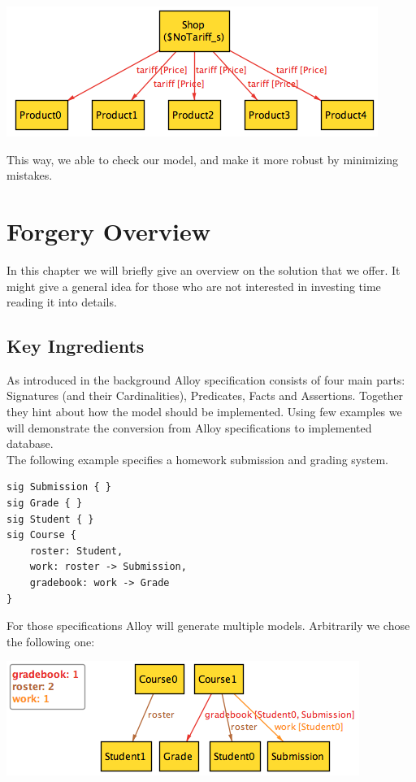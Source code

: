 \documentclass[oneside]{book}
\begin{document}
\begin{center}
\includegraphics[scale=0.6]{counterexample1}
\end{center}

This way, we able to check our model, and make it more robust by minimizing mistakes.

\newpage

\chapter{Forgery Overview}
In this chapter we will briefly give an overview on the solution that we offer. It might give a general idea for those who are not interested in investing time reading it into details.

\section{Key Ingredients}

As introduced in the background Alloy specification consists of four main parts: Signatures (and their Cardinalities), Predicates, Facts and Assertions. Together they hint about how the model should be implemented. Using few examples we will demonstrate the conversion from Alloy specifications to implemented database.\\

The following example specifies a homework submission and grading system. 

\begin{lstlisting}
sig Submission { } 
sig Grade { }
sig Student { }
sig Course {
	roster: Student,
	work: roster -> Submission,
	gradebook: work -> Grade
}
\end{lstlisting}

For those specifications Alloy will generate multiple models. Arbitrarily we chose the following one:\\

\begin{center}
\includegraphics[scale=0.6]{overview1}
\end{center}
\end{document}

